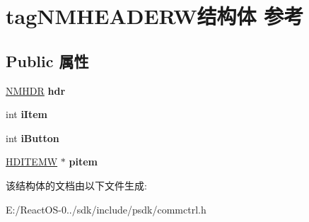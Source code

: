 \hypertarget{structtag_n_m_h_e_a_d_e_r_w}{}\section{tag\+N\+M\+H\+E\+A\+D\+E\+R\+W结构体 参考}
\label{structtag_n_m_h_e_a_d_e_r_w}
\subsection*{Public 属性}
\begin{DoxyCompactItemize}
\item 
\mbox{\label{structtag_n_m_h_e_a_d_e_r_w_a05e36814d500c9bace2b35bb722c8a64}} 
\hyperlink{structtag_n_m_h_d_r}{N\+M\+H\+DR} {\bfseries hdr}
\item 
\mbox{\label{structtag_n_m_h_e_a_d_e_r_w_ad030c31ab7a4b63382526fd04aac8930}} 
int {\bfseries i\+Item}
\item 
\mbox{\label{structtag_n_m_h_e_a_d_e_r_w_ac2b8f1bed36d7b8d0f7bfbb9d5289744}} 
int {\bfseries i\+Button}
\item 
\mbox{\label{structtag_n_m_h_e_a_d_e_r_w_a034da1573cb2a2f2d81fd90aeb6e6476}} 
\hyperlink{struct___h_d___i_t_e_m_w}{H\+D\+I\+T\+E\+MW} $\ast$ {\bfseries pitem}
\end{DoxyCompactItemize}


该结构体的文档由以下文件生成\+:\begin{DoxyCompactItemize}
\item 
E\+:/\+React\+O\+S-\/0../sdk/include/psdk/commctrl.\+h\end{DoxyCompactItemize}
